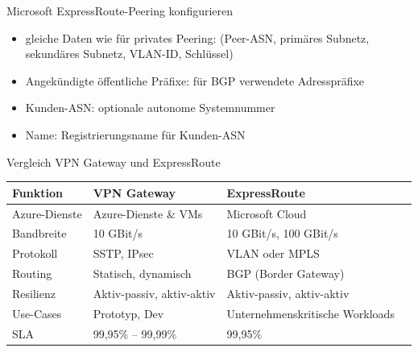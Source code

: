 \begin{flashcard}[Definition]{Microsoft ExpressRoute-Peering konfigurieren}
    \begin{itemize}
        \item gleiche Daten wie für privates Peering: \newline
            (Peer-ASN, primäres Subnetz, sekundäres Subnetz, VLAN-ID, Schlüssel)
        \item Angekündigte öffentliche Präfixe: für BGP verwendete Adresspräfixe
        \item Kunden-ASN: optionale autonome Systemnummer
        \item Name: Registrierungsname für Kunden-ASN
    \end{itemize}
\end{flashcard}

\begin{flashcard}[Definition]{Vergleich VPN Gateway und ExpressRoute}
    \begin{tabular}{l|lll}
        Funktion       &  VPN Gateway               & ExpressRoute                    \\
        \hline
        Azure-Dienste  &  Azure-Dienste \& VMs      & Microsoft Cloud                 \\
        Bandbreite     &  10 GBit/s                 & 10 GBit/s, 100 GBit/s           \\
        Protokoll      &  SSTP, IPsec               & VLAN oder MPLS                  \\
        Routing        &  Statisch, dynamisch       & BGP (Border Gateway)            \\
        Resilienz      &  Aktiv-passiv, aktiv-aktiv & Aktiv-passiv, aktiv-aktiv       \\
        Use-Cases      & Prototyp, Dev              & Unternehmenskritische Workloads \\
        SLA            & 99,95\% -- 99,99\%         & 99,95\%                         \\
    \end{tabular}
\end{flashcard}


